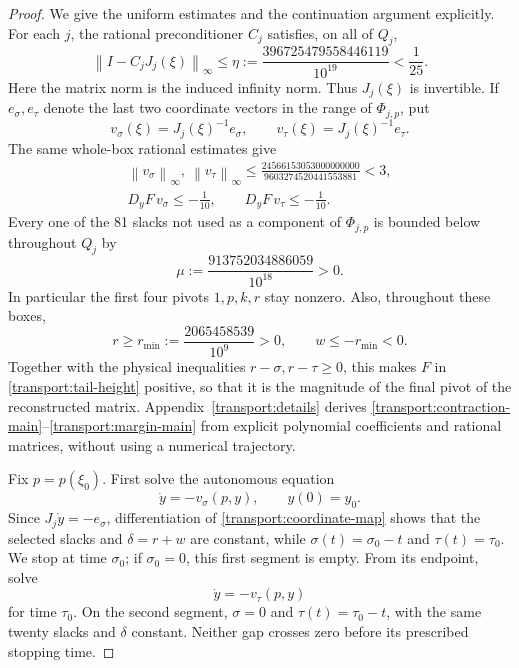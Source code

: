 \documentclass[11pt,reqno]{amsart}
\theoremstyle{definition}
\theoremstyle{remark}
\newcommand{\iin}[1]{\left\|#1\right\|_\infty}
\begin{document}
\begin{proof}
We give the uniform estimates and the continuation argument explicitly.
For each \(j\), the rational preconditioner \(C_j\) satisfies, on all
of \(Q_j\),
\begin{equation}\label{transport:contraction-main}
\iin{I-C_jJ_j(\xi)}\le
\eta:=\frac{396725479558446119}{10^{19}}<\frac1{25}.
\end{equation}
Here the matrix norm is the induced infinity norm.  Thus \(J_j(\xi)\)
is invertible.  If \(e_\sigma,e_\tau\) denote the last two coordinate
vectors in the range of \(\Phi_{j,p}\), put
\[
v_\sigma(\xi)=J_j(\xi)^{-1}e_\sigma,
\qquad v_\tau(\xi)=J_j(\xi)^{-1}e_\tau.
\]
The same whole-box rational estimates give
\begin{equation}\label{transport:direction-main}
\begin{gathered}
\iin{v_\sigma},\ \iin{v_\tau}\le
\frac{24566153053000000000}{9603274520441553881}<3,\\
D_yF\,v_\sigma\le-\frac1{10},\qquad
D_yF\,v_\tau\le-\frac1{10}.
\end{gathered}
\end{equation}
Every one of the 81 slacks not used as a component of
\(\Phi_{j,p}\) is bounded below throughout \(Q_j\) by
\begin{equation}\label{transport:margin-main}
\mu:=\frac{913752034886059}{10^{18}}>0.
\end{equation}
In particular the first four pivots \(1,p,k,r\) stay nonzero.
Also, throughout these boxes,
\[
r\ge r_{\min}:=\frac{2065458539}{10^9}>0,
\qquad w\le-r_{\min}<0.
\]
Together with the physical inequalities \(r-\sigma,r-\tau\ge0\),
this makes \(F\) in \eqref{transport:tail-height} positive, so that
it is the magnitude of the final pivot of the reconstructed matrix.
Appendix~\ref{transport:details} derives
\eqref{transport:contraction-main}--\eqref{transport:margin-main}
from explicit polynomial coefficients and rational matrices, without
using a numerical trajectory.

Fix \(p=p(\xi_0)\).  First solve the autonomous equation
\begin{equation}\label{transport:first-flow}
\dot y=-v_\sigma(p,y),\qquad y(0)=y_0.
\end{equation}
Since \(J_j\dot y=-e_\sigma\), differentiation of
\eqref{transport:coordinate-map} shows that the selected slacks and
\(\delta=r+w\) are constant, while
\(\sigma(t)=\sigma_0-t\) and \(\tau(t)=\tau_0\).
We stop at time \(\sigma_0\); if \(\sigma_0=0\), this first segment
is empty.  From its endpoint, solve
\begin{equation}\label{transport:second-flow}
\dot y=-v_\tau(p,y)
\end{equation}
for time \(\tau_0\).  On the second segment, \(\sigma=0\) and
\(\tau(t)=\tau_0-t\), with the same twenty slacks and \(\delta\)
constant.  Neither gap crosses zero before its prescribed stopping
time.


\end{proof}
\end{document}
